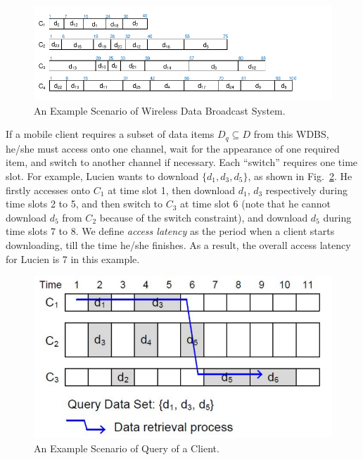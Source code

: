 \documentclass[12pt,a4paper]{article}
\theoremstyle{definition}
\begin{document}
\begin{enumerate}
		\begin{figure}[h]
			\centering
			\includegraphics[scale=1]{Fig-Broadcast.pdf}
			\caption{An Example Scenario of Wireless Data Broadcast System.} \label{Fig-Broadcast}
		\end{figure}
		
		If a mobile client requires a subset of data items $D_q \subseteq D$ from this WDBS, he/she must access onto one channel, wait for the appearance of one required item, and switch to another channel if necessary. Each ``switch'' requires one time slot. For example, Lucien wants to download $\{d_1, d_3, d_5\}$, as shown in Fig.~\ref{Fig-Access}. He firstly accesses onto $C_1$ at time slot 1, then download $d_1$, $d_3$ respectively during time slots 2 to 5, and then switch to $C_3$ at time slot 6 (note that he cannot download $d_5$ from $C_2$ because of the switch constraint), and download $d_5$ during time slots 7 to 8. We define \emph{access latency} as the period when a client starts downloading, till the time he/she finishes. As a result, the overall access latency for Lucien is 7 in this example.
		
		\begin{figure}[!htbp]
			\centering
			\includegraphics[scale= 0.5]{Fig-Access.pdf}
			\caption{An Example Scenario of Query of a Client.} \label{Fig-Access}
		\end{figure}
		

\end{enumerate}
\end{document}
